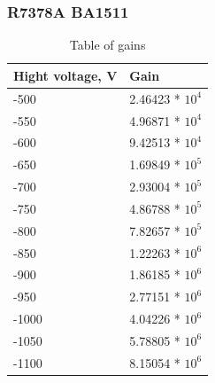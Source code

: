 \documentclass{beamer}
\begin{document}
\begin{frame}
\frametitle{R7378A BA1511}
\begin{table}
\begin{tabular}{l l}
\toprule
\textbf{Hight voltage, V} & \textbf{Gain} \\
\midrule
-500 & 2.46423 * $10^4$\\
-550 &  4.96871 * $10^4$\\
-600 &  9.42513 * $10^4$\\
-650 &  1.69849 * $10^5$\\
-700 &  2.93004 * $10^5$\\
-750 &  4.86788 * $10^5$\\
-800 &  7.82657 * $10^5$\\
-850 &  1.22263 * $10^6$\\
-900 &  1.86185 * $10^6$\\
-950 &  2.77151 * $10^6$\\
-1000 &  4.04226 * $10^6$\\
-1050 &  5.78805 * $10^6$\\
-1100 &  8.15054 * $10^6$\\
\bottomrule
\end{tabular}
\caption{Table of gains}
\end{table}
\end{frame}
\end{document}
